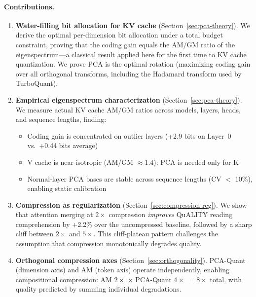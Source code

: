 \paragraph{Contributions.}
\begin{enumerate}
    \item \textbf{Water-filling bit allocation for KV cache} (Section~\ref{sec:pca-theory}). We derive the optimal per-dimension bit allocation under a total budget constraint, proving that the coding gain equals the AM/GM ratio of the eigenspectrum---a classical result applied here for the first time to KV cache quantization. We prove PCA is the optimal rotation (maximizing coding gain over all orthogonal transforms, including the Hadamard transform used by TurboQuant).

    \item \textbf{Empirical eigenspectrum characterization} (Section~\ref{sec:pca-theory}). We measure actual KV cache AM/GM ratios across models, layers, heads, and sequence lengths, finding:
    \begin{itemize}
        \item Coding gain is concentrated on outlier layers (+2.9 bits on Layer~0 vs.\ +0.44 bits average)
        \item V cache is near-isotropic (AM/GM $\approx 1.4$): PCA is needed only for K
        \item Normal-layer PCA bases are stable across sequence lengths (CV $<$ 10\%), enabling static calibration
    \end{itemize}

    \item \textbf{Compression as regularization} (Section~\ref{sec:compression-reg}). We show that attention merging at $2\times$ compression \emph{improves} QuALITY reading comprehension by +2.2\% over the uncompressed baseline, followed by a sharp cliff between $2\times$ and $5\times$. This cliff-plateau pattern challenges the assumption that compression monotonically degrades quality.

    \item \textbf{Orthogonal compression axes} (Section~\ref{sec:orthogonality}). PCA-Quant (dimension axis) and AM (token axis) operate independently, enabling compositional compression: AM $2\times$ $\times$ PCA-Quant $4\times$ $= 8\times$ total, with quality predicted by summing individual degradations.
\end{enumerate}
